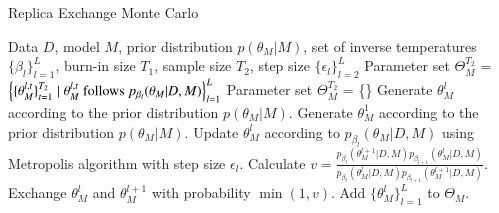 \documentclass[12pt]{article}
\begin{document}
  \begin{algorithm}[H]
    \caption{Replica Exchange Monte Carlo}
    \label{EMC}
    \begin{algorithmic}[1]
    \REQUIRE Data $D$, model $M$, prior distribution $p(\theta_M|M)$, set of inverse temperatures $\{\beta_l\}_{l = 1}^L$, burn-in size $T_1$, sample size $T_2$, step size $\{\epsilon_l\}_{l = 2}^L$
    \ENSURE Parameter set $\Theta_M^{T_2}$ = $\left\{\{\theta_M^{l,t}\}_{t = 1}^{T_2} \mid \theta_M^{l,t} \textup{ follows } p_{\beta_l}(\theta_M|D, M)\right\}_{l = 1}^L$
    \STATE Parameter set $\Theta_M^{T_2}$ = \{\}
        \STATE Generate $\theta_M^{l}$ according to the prior distribution $p(\theta_M|M)$.
    \ENDFOR
      \STATE Generate $\theta_M^{1}$ according to the prior distribution $p(\theta_M|M)$.
        \STATE Update $\theta_M^{l}$ according to $p_{\beta_l}(\theta_M|D, M)$ using Metropolis algorithm with step size $\epsilon_l$.
      \ENDFOR
        \STATE Calculate $v = \frac{p_{\beta_{l}}(\theta_M^{l+1}|D,M)p_{\beta_{l+1}}(\theta_M^{l}|D,M)}{p_{\beta_{l}}(\theta_M^{l}|D,M)p_{\beta_{l+1}}(\theta_M^{l+1}|D,M)}$.
        \STATE Exchange $\theta_M^l$ and $\theta_M^{l+1}$ with probability $\min(1,v)$.
      \ENDFOR
        \STATE Add $\{\theta_M^l\}_{l=1}^L$ to $\Theta_M$.
      \ENDIF
    \ENDFOR
    \end{algorithmic}
  \end{algorithm}
\end{document}
